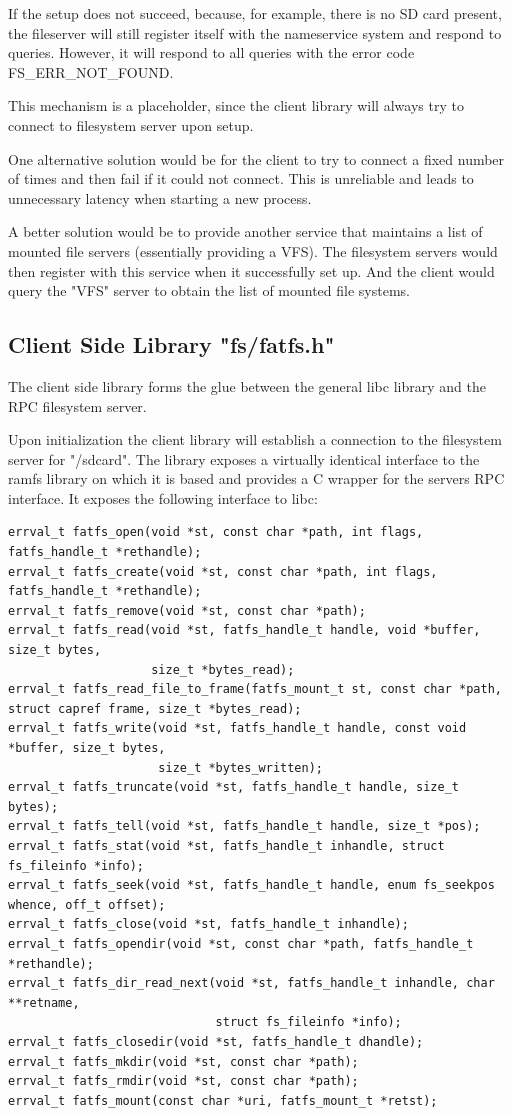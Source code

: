 If the setup does not succeed, because, for example, there is no SD card
present, the fileserver will still register itself with the nameservice system
and respond to queries.
However, it will respond to all queries with the error code FS\_ERR\_NOT\_FOUND.

This mechanism is a placeholder, since the client library will always try to 
connect to filesystem server upon setup.

One alternative solution would be for the client to try to connect a fixed 
number of times and then fail if it could not connect.
This is unreliable and leads to unnecessary latency when starting a new process.

A better solution would be to provide another service that maintains a list of
mounted file servers (essentially providing a VFS).
The filesystem servers would then register with this service when it successfully
set up.
And the client would query the "VFS" server to obtain the list of mounted
file systems.


\subsection{Client Side Library "fs/fatfs.h"}

The client side library forms the glue between the general libc library and the
RPC filesystem server.

Upon initialization the client library will establish a connection to the
filesystem server for "/sdcard".
The library exposes a virtually identical interface to the ramfs library on which 
it is based and provides a C wrapper for the servers RPC interface.
It exposes the following interface to libc:

\begin{verbatim}
errval_t fatfs_open(void *st, const char *path, int flags, fatfs_handle_t *rethandle);
errval_t fatfs_create(void *st, const char *path, int flags, fatfs_handle_t *rethandle);
errval_t fatfs_remove(void *st, const char *path);
errval_t fatfs_read(void *st, fatfs_handle_t handle, void *buffer, size_t bytes,
                    size_t *bytes_read);
errval_t fatfs_read_file_to_frame(fatfs_mount_t st, const char *path, struct capref frame, size_t *bytes_read);
errval_t fatfs_write(void *st, fatfs_handle_t handle, const void *buffer, size_t bytes,
                     size_t *bytes_written);
errval_t fatfs_truncate(void *st, fatfs_handle_t handle, size_t bytes);
errval_t fatfs_tell(void *st, fatfs_handle_t handle, size_t *pos);
errval_t fatfs_stat(void *st, fatfs_handle_t inhandle, struct fs_fileinfo *info);
errval_t fatfs_seek(void *st, fatfs_handle_t handle, enum fs_seekpos whence, off_t offset);
errval_t fatfs_close(void *st, fatfs_handle_t inhandle);
errval_t fatfs_opendir(void *st, const char *path, fatfs_handle_t *rethandle);
errval_t fatfs_dir_read_next(void *st, fatfs_handle_t inhandle, char **retname,
                             struct fs_fileinfo *info);
errval_t fatfs_closedir(void *st, fatfs_handle_t dhandle);
errval_t fatfs_mkdir(void *st, const char *path);
errval_t fatfs_rmdir(void *st, const char *path);
errval_t fatfs_mount(const char *uri, fatfs_mount_t *retst);
\end{verbatim}

